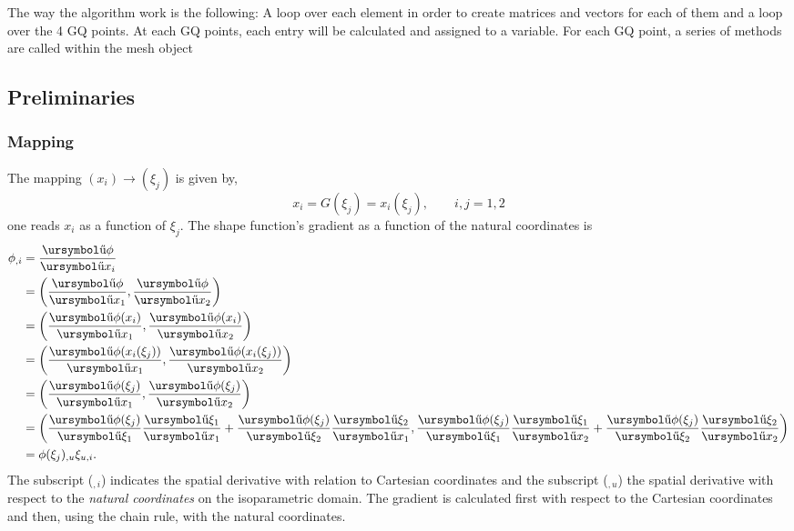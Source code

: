 \documentclass[10pt, a4paper]{article}
\def\urpartial{\mbox{\ursymbol\char"B6}}
\begin{document}
The way the algorithm work is the following: A loop over each element in order to create matrices and vectors for each of them and a loop over the 4 GQ points. At each GQ points, each entry will be calculated and assigned to a variable. For each GQ point, a series of methods are called within the mesh object

\subsection{Preliminaries}
\subsubsection{Mapping}

The mapping $(x_i) \rightarrow (\xi_j)$ is given by,
\begin{equation*}
x_i = G(\xi_j) = x_i(\xi_j), \qquad i,j = 1,2
\end{equation*}
one reads $x_i$ as a function of $\xi_j$. The shape function's gradient as a function of the natural coordinates is
\begin{align*}
\phi_{,i} &= \dfrac{\urpartial \phi}{\urpartial x_i} \\
	&= \left( \dfrac{\urpartial \phi}{\urpartial x_1}, \dfrac{\urpartial \phi}{\urpartial x_2} \right)\\
	&= \left( \dfrac{\urpartial \phi(x_i)}{\urpartial x_1}, \dfrac{\urpartial \phi (x_i)}{\urpartial x_2} \right)\\
	&= \left( \dfrac{\urpartial \phi(x_i(\xi_j))}{\urpartial x_1}, \dfrac{\urpartial \phi (x_i(\xi_j))}{\urpartial x_2} \right) \\
	&= \left( \dfrac{\urpartial \phi(\xi_j)}{\urpartial x_1}, \dfrac{\urpartial \phi (\xi_j)}{\urpartial x_2} \right) \\
	&= \left( \dfrac{\urpartial \phi(\xi_j)}{\urpartial \xi_1} \dfrac{\urpartial \xi_1}{\urpartial x_1} + \dfrac{\urpartial \phi(\xi_j)}{\urpartial \xi_2} \dfrac{\urpartial \xi_2}{\urpartial x_1},  \dfrac{\urpartial \phi(\xi_j)}{\urpartial \xi_1} \dfrac{\urpartial \xi_1}{\urpartial x_2} + \dfrac{\urpartial \phi(\xi_j)}{\urpartial \xi_2} \dfrac{\urpartial \xi_2}{\urpartial x_2}\right) \\
	&= \phi(\xi_j)_{,u} \xi_{u,i} .
\end{align*}
The subscript (${}_{,i}$) indicates the spatial derivative with relation to Cartesian coordinates and the subscript (${}_{,u}$) the spatial derivative with respect to the \emph{natural coordinates} on the isoparametric domain. The gradient is calculated first with respect to the Cartesian coordinates and then, using the chain rule, with the natural coordinates. 
\end{document}
